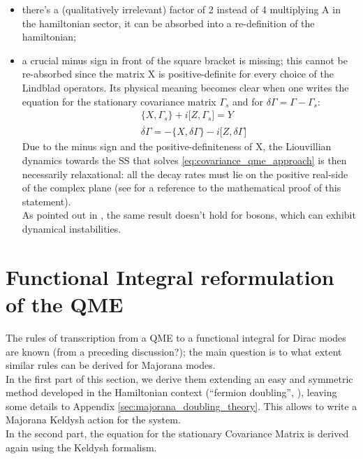 \documentclass[a4paper,11pt]{article}
\theoremstyle{remark}
\newcommand{\np}{\vskip 1.3cm}
\begin{document}
   \begin{itemize} 
   \item there's a (qualitatively irrelevant) factor of 2 instead of 4 multiplying A in the hamiltonian sector, it can be absorbed into a re-definition of the hamiltonian; 
   \item a crucial minus sign in front of the square bracket is missing; this cannot be re-absorbed since the matrix X is positive-definite for every choice of the Lindblad operators. Its physical meaning becomes clear when one writes the equation for the stationary covariance matrix $\Gamma_s$ and for $\delta\Gamma=\Gamma-\Gamma_s$:
   \begin{subequations}
    \begin{align}
     &\big\{ X,\Gamma_s\big\}+i\big[Z,\Gamma_s\big] = Y  \label{eq:covariance_qme_stationary} \\
     &\dot{\delta\Gamma}=-\big\{ X,\delta\Gamma\big\}-i\big[Z,\delta\Gamma\big] \label{eq:covariance_qme_approach}
    \end{align}
   \end{subequations}
   Due to the minus sign and the positive-definiteness of X, the Liouvillian dynamics towards the SS that solves \eqref{eq:covariance_qme_approach} is then necessarily relaxational: all the decay rates  must lie on the positive real-side of the complex plane (see \cite{Eisert2010} for a reference to the mathematical proof of this statement).\\ As pointed out in \cite{Eisert2010}, the same result doesn't hold for bosons, which can exhibit dynamical instabilities.\end{itemize}\np


   
 \section{Functional Integral reformulation of the QME}
 The rules of transcription from a QME to a functional integral for Dirac modes are known (from a preceding discussion?); the main question is to what extent similar rules can be derived for Majorana modes.\\ In the first part of this section, we derive them extending an easy and symmetric method developed in the Hamiltonian context (``fermion doubling'', \cite{Nilsson2013}), leaving some details to Appendix \eqref{sec:majorana_doubling_theory}. This allows to write a Majorana Keldysh action for the system. \\In the second part, the equation for the stationary Covariance Matrix is derived again using the Keldysh formalism.\np
\end{document}
